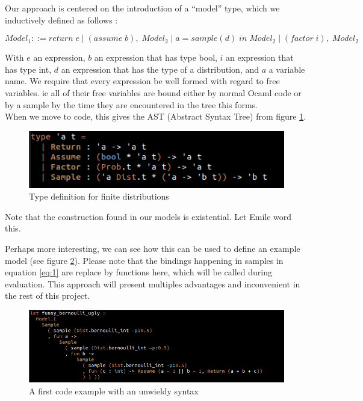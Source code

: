 \documentclass{article}
\newcommand\SC[1]{{\color{violet}{\it \bf Simon :} #1}}
\begin{document}
	Our approach is centered on the introduction of a ``model'' type, which we inductively defined as follows : 


	\begin{equation}
	  Model_1 ::= return \; e \; | \; (assume \; b), \; Model_2 \; | \; a = sample(d) \; in \;Model_2 \; | \;  (factor \; i), \; Model_2
	  \label{eq:1}
	\end{equation}

	With $e$ an expression, $b$ an expression that has type bool, $i$ an expression that has type int, $d$ an expression that has the type of a distribution, and $a$ a variable name.
	We require that every expression be well formed with regard to free variables. ie all of their free variables are bound either by normal Ocaml code or by a sample by the time they are encountered in the tree this forms. \\

	When we move to code, this gives the AST (Abstract Syntax Tree) from figure \ref{fig:AST1}.
	\begin{figure}[h]
	  \centering
	  \includegraphics[scale=0.7]{images/AST1.png}
	  \caption{Type definition for finite distributions}
	  \label{fig:AST1}
	\end{figure}
	
	Note that the construction found in our models is existential. \SC{Let Emile word this.}

	Perhaps more interesting, we can see how this can be used to define an example model (see figure \ref{fig:UglyEx}).
	Please note that the bindings happening in samples in equation \ref{eq:1} are replace by functions here, which will be called during evaluation.
	This approach will present multiples advantages and inconvenient in the rest of this project.

	\begin{figure}[h]
	  \centering
	  \includegraphics[scale=0.5]{images/ExampleUgly.png}
	  \caption{A first code example with an unwieldy syntax}
	  \label{fig:UglyEx}
	\end{figure}
\end{document}
